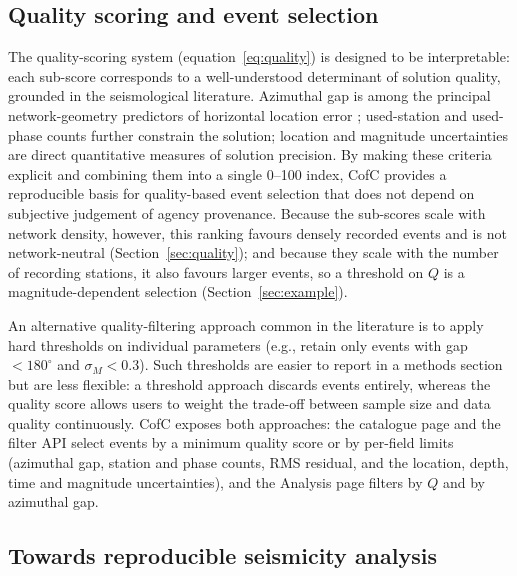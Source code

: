 \documentclass[12pt]{article}
\begin{document}
\subsection{Quality scoring and event selection}

The quality-scoring system (equation~\eqref{eq:quality}) is designed to be
interpretable: each sub-score corresponds to a well-understood determinant of
solution quality, grounded in the seismological literature.  Azimuthal gap
is among the principal network-geometry predictors of
horizontal location error \citep{bondar2004}; used-station and
used-phase counts further constrain the solution;
location and magnitude uncertainties are direct quantitative measures of
solution precision.  By making these criteria explicit and combining them into
a single 0--100 index, CofC provides a reproducible basis for quality-based
event selection that does not depend on subjective judgement of agency
provenance.  Because the sub-scores scale with network density, however, this
ranking favours densely recorded events and is not network-neutral
(Section~\ref{sec:quality}); and because they scale with the number of recording
stations, it also favours larger events, so a threshold on $Q$ is a
magnitude-dependent selection (Section~\ref{sec:example}).

An alternative quality-filtering approach common in the literature is to
apply hard thresholds on individual parameters (e.g., retain only events with
gap $< 180^{\circ}$ and $\sigma_M < 0.3$).  Such thresholds are easier to
report in a methods section but are less flexible: a threshold approach
discards events entirely, whereas the quality score allows users to weight
the trade-off between sample size and data quality continuously.  CofC
exposes both approaches: the catalogue page and the filter API select events by
a minimum quality score or by per-field limits (azimuthal gap, station and
phase counts, RMS residual, and the location, depth, time and magnitude
uncertainties), and the Analysis page filters by $Q$ and by azimuthal gap.

\subsection{Towards reproducible seismicity analysis}
\end{document}
